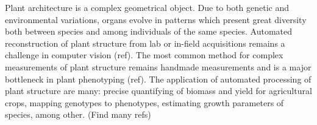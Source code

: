 


Plant architecture is a complex geometrical object. Due to both genetic and
environmental variations, organs evolve in patterns which present great diversity
both between species and among individuals of the same species. Automated
reconstruction of plant structure from lab or in-field acquisitions remains a challenge in computer
vision (ref). The most common method for complex measurements of plant structure
remains handmade measurements and is a major bottleneck in plant phenotyping
(ref).  The application of automated processing of plant structure are many: precise
quantifying of biomass and yield for agricultural crops, mapping genotypes to
phenotypes, estimating growth parameters of species, among other. (Find many
refs)


